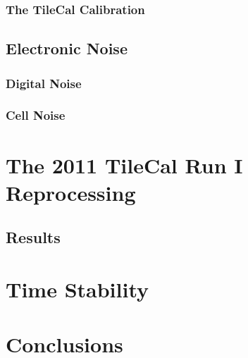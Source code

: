 \documentclass[10pt,twoside,cucitura,classica,english,openany]{toptesi}
\begin{document}
\subsubsection{The TileCal Calibration}
\label{sec:tilecal-calibration}



\subsection{Electronic Noise}
\label{sec:electronic-noise}



\subsubsection{Digital Noise}
\label{sec:digital-noise}



\subsubsection{Cell Noise}
\label{sec:cell-noise}



\section{The 2011 TileCal Run I Reprocessing}
\label{sec:2011-tilecal-run}



\subsection{Results}
\label{sec:results-1}



\section{Time Stability}
\label{sec:time-stability}



\section{Conclusions}
\label{sec:conclusions}


\end{document}
